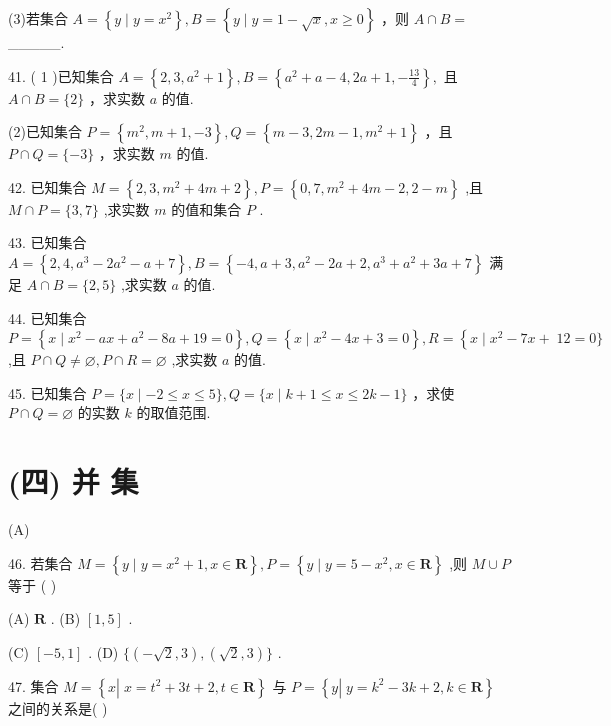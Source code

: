 \documentclass[10pt]{article}
\begin{document}
(3)若集合 \(A = \left\{  {y \mid  y = {x}^{2}}\right\}  ,B = \left\{  {y \mid  y = 1 - \sqrt{x},x \geq  0}\right\}\) ，则 \(A \cap  B =\) \_\_\_\_\_.

41. ( 1 )已知集合 \(A = \left\{  {2,3,{a}^{2} + 1}\right\}  ,B = \left\{  {{a}^{2} + a - 4,{2a} + 1, - \frac{13}{4}}\right\}  ,\) 且 \(A \cap  B = \{ 2\}\) ，求实数 \(a\) 的值.

(2)已知集合 \(P = \left\{  {{m}^{2},m + 1, - 3}\right\}  ,Q = \left\{  {m - 3,{2m} - 1,{m}^{2} + 1}\right\}\) ，且 \(P \cap  Q = \{  - 3\}\) ，求实数 \(m\) 的值.

42. 已知集合 \(M = \left\{  {2,3,{m}^{2} + {4m} + 2}\right\}  ,P = \left\{  {0,7,{m}^{2} + {4m} - 2,2 - m}\right\}\) ,且 \(M \cap  P = \{ 3,7\}\) ,求实数 \(m\) 的值和集合 \(P\) .

43. 已知集合 \(A = \left\{  {2,4,{a}^{3} - 2{a}^{2} - a + 7}\right\}  ,B = \left\{  {-4,a + 3,{a}^{2} - {2a} + 2,{a}^{3} + {a}^{2} + {3a} + 7}\right\}\) 满足 \(A \cap  B = \{ 2,5\}\) ,求实数 \(a\) 的值.

44. 已知集合 \(P = \left\{  {x \mid  {x}^{2} - {ax} + {a}^{2} - {8a} + {19} = 0}\right\}  ,Q = \left\{  {x \mid  {x}^{2} - {4x} + 3 = 0}\right\}  ,R = \left\{  {x \mid  {x}^{2} - {7x} + }\right. \; {12} = 0\}\) ,且 \(P \cap  Q \neq  \varnothing ,P \cap  R = \varnothing\) ,求实数 \(a\) 的值.

45. 已知集合 \(P = \{ x \mid   - 2 \leq  x \leq  5\} ,Q = \{ x \mid  k + 1 \leq  x \leq  {2k} - 1\}\) ，求使 \(P \cap  Q = \varnothing\) 的实数 \(k\) 的取值范围.

\section*{(四) 并 集}

(A)

46. 若集合 \(M = \left\{  {y \mid  y = {x}^{2} + 1,x \in  \mathbf{R}}\right\}  ,P = \left\{  {y \mid  y = 5 - {x}^{2},x \in  \mathbf{R}}\right\}\) ,则 \(M \cup  P\) 等于 ( )

(A) \(\mathbf{R}\) . (B) \(\left\lbrack  {1,5}\right\rbrack\) .

(C) \(\left\lbrack  {-5,1}\right\rbrack\) . (D) \(\{ \left( {-\sqrt{2},3}\right) ,\left( {\sqrt{2},3}\right) \}\) .

47. 集合 \(M = \left\{  {x\left| {\;x = {t}^{2} + {3t} + 2}\right. ,t \in  \mathbf{R}}\right\}\) 与 \(P = \left\{  {y\left| {\;y = {k}^{2} - {3k} + 2}\right. ,k \in  \mathbf{R}}\right\}\) 之间的关系是( )
\end{document}
